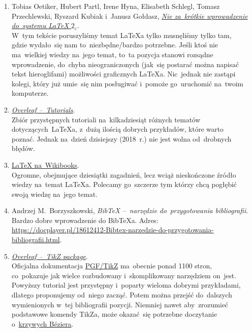 \documentclass[a4paper,11pt]{article}
\begin{document}
\begin{enumerate}
\item Tobias Oetiker, Hubert Partl, Irene Hyna, Elisabeth Schlegl,
  Tomasz Przechlewski, Ryszard Kubiak i~Janusz Gołdasz,
  \href{http://www.ptep-online.com/ctan/lshort_polish.pdf} {\emph{Nie
      za~krótkie wprowadzenie do~systemu \LaTeX{}
      $2_{ \varepsilon }$}}. \\
  W~tym tekście poruszyliśmy temat \LaTeX a tylko musnęliśmy tylko
  tam, gdzie wydało~się nam to~niezbędne/bardzo potrzebne. Jeśli ktoś
  nie ma~wielkiej wiedzy na~jego temat, to~ta pozycja stanowi rozsądne
  wprowadzenie, do~chyba nieograniczonych (jak~się postarać można
  napisać tekst hieroglifami) możliwości graficznych \LaTeX a.
  Nic~jednak nie zastąpi kolegi, który już umie~się nim posługiwać
  i~pomoże go~uruchomić na~twoim komputerze.

\item \href{https://www.overleaf.com/learn/latex/Tutorials}{\emph{Overleaf --~Tutorials}}. \\
  Zbiór przystępnych tutoriali na~kilkadziesiąt różnych tematów
  dotyczących~\LaTeX a, z~dużą ilością dobrych przykładów, które warto
  poznać. Jednak na~dzień dzisiejszy (2018~r.) nie jest wolna
  od~drobnych błędów.

\item \href{https://en.wikibooks.org/wiki/LaTeX}{\LaTeX{} na~Wikibooks}. \\
  Ogromne, obejmujące dziesiątki zagadnień, lecz wciąż nieskończone
  źródło wiedzy na~temat \LaTeX a. Polecamy go~szczerze tym którzy
  chcą pogłębić swoją wiedzę na~jego temat.

\item Andrzej M.~Borzyszkowski, \emph{Bib\TeX{} --~narzędzie
    do~przygotowania bibliografii}. \\
  Bardzo dobre wprowadzenie do Bib\TeX a. Adres:
  \href{https://docplayer.pl/18612412-Bibtex-narzedzie-do-przygotowania-bibliografii.html}
  {https://docplayer.pl/18612412-Bibtex-narzedzie-do-przygotowania-bibliografii.html}.

\item \href{https://www.overleaf.com/learn/latex/TikZ_package}{\emph{Overleaf --~TikZ package}}. \\
  Oficjalna dokumentacja
  \href{http://piotrkosoft.net/pub/mirrors/CTAN/graphics/pgf/base/doc/pgfmanual.pdf}{PGF/TikZ}
  ma~obecnie ponad 1100 stron, co~pokazuje jak wielce rozbudowany
  i~skomplikowany narzędziem on~jest. Powyższy tutorial jest
  przystępny i~poparty wieloma dobrymi przykładami, dlatego
  proponujemy od~niego zacząć. Potem można przejść do~dalszych
  wymienionych w~tej bibliografii pozycji. Niemniej nawet
  aby~zrozumieć podstawowe komendy TikZa, może okazać~się potrzebne
doczytanie o~\href{https://pl.wikipedia.org/wiki/Krzywa_B\%C3\%A9ziera}{krzywych
    B\'{e}ziera}.


\end{enumerate}
\end{document}
